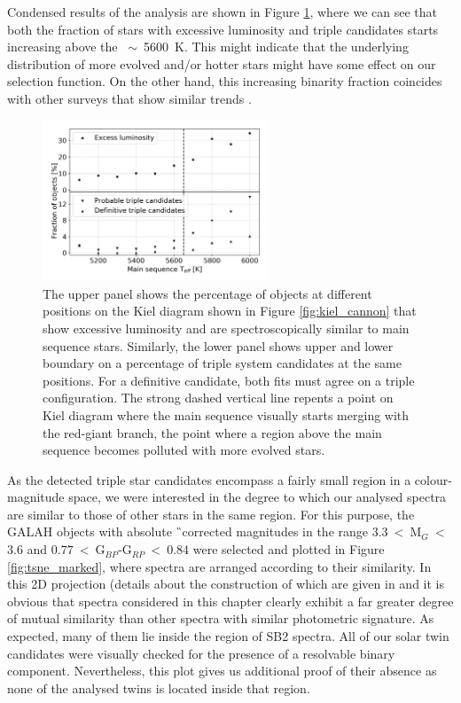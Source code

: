 Condensed results of the analysis are shown in Figure \ref{fig:triple_hr}, where we can see that both the fraction of stars with excessive luminosity and triple candidates starts increasing above the \Teff~$\sim$~5600~K. This might indicate that the underlying distribution of more evolved and/or hotter stars might have some effect on our selection function. On the other hand, this increasing binarity fraction coincides with other surveys that show similar trends \cite{2013ARA&A..51..269D}.

\begin{figure}
	\centering
	\includegraphics[width=0.6\textwidth]{teff_triple_dist.png}
	\caption{The upper panel shows the percentage of objects at different positions on the Kiel diagram shown in Figure \ref{fig:kiel_cannon} that show excessive luminosity and are spectroscopically similar to main sequence stars. Similarly, the lower panel shows upper and lower boundary on a percentage of triple system candidates at the same positions. For a definitive candidate, both fits must agree on a triple configuration. The strong dashed vertical line repents a point on Kiel diagram where the main sequence visually starts merging with the red-giant branch, the point where a region above the main sequence becomes polluted with more evolved stars.}
	\label{fig:triple_hr}
\end{figure}

As the detected triple star candidates encompass a fairly small region in a colour-magnitude space, we were interested in the degree to which our analysed spectra are similar to those of other stars in the same region. For this purpose, the GALAH objects with absolute \G\ corrected magnitudes in the range $3.3$~<~M$_{G}$~<~$3.6$ and $0.77$~<~G$_{BP}$-G$_{RP}$~<~$0.84$ were selected and plotted in Figure \ref{fig:tsne_marked}, where spectra are arranged according to their similarity. In this 2D projection (details about the construction of which are given in \citet{2017ApJS..228...24T} and \citet{buder2018} it is obvious that spectra considered in this chapter clearly exhibit a far greater degree of mutual similarity than other spectra with similar photometric signature. As expected, many of them lie inside the region of SB2 spectra. All of our solar twin candidates were visually checked for the presence of a resolvable binary component. Nevertheless, this plot gives us additional proof of their absence as none of the analysed twins is located inside that region.

